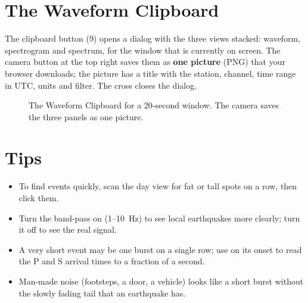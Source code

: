 \section{The Waveform Clipboard}\label{sec:clip}
The clipboard button (9) opens a dialog with the three views stacked: waveform, spectrogram and spectrum, for the window that is
currently on screen. The camera button at the top right saves them as \textbf{one picture} (PNG) that your browser downloads;
the picture has a title with the station, channel, time range in UTC, units and filter. The cross closes the dialog.

\begin{figure}[tbp]
\centering
{}
\caption{The Waveform Clipboard for a 20-second window. The camera saves the three panels as one picture.}
\end{figure}

\section{Tips}
\begin{itemize}
\item To find events quickly, scan the day view for fat or tall spots on a row, then click them.
\item Turn the band-pass on (1--10~Hz) to see local earthquakes more clearly; turn it off to see the real signal.
\item A very short event may be one burst on a single row; use  on its onset to read the P and S arrival times to a
  fraction of a second.
\item Man-made noise (footsteps, a door, a vehicle) looks like a short burst without the slowly fading tail that an earthquake has.
\end{itemize}
